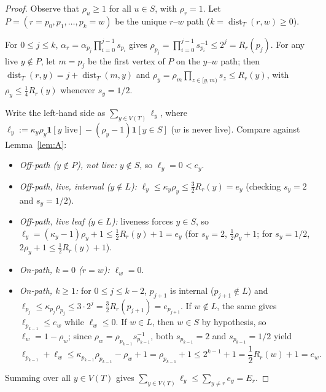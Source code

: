 \documentclass[11pt]{article}
\DeclareMathOperator{\dist}{dist}
\begin{document}
\begin{proof}
Observe that $\rho_u \ge 1$ for all $u \in S$, with $\rho_r = 1$. Let $P = (r = p_0, p_1, \dots, p_k = w)$ be the unique $r$--$w$ path ($k = \dist_T(r,w) \ge 0$).

For $0 \le j \le k$, $\alpha_r = \alpha_{p_j}\prod_{i=0}^{j-1} s_{p_i}$ gives $\rho_{p_j} = \prod_{i=0}^{j-1} s_{p_i}^{-1} \le 2^j = R_r(p_j)$. For any live $y \notin P$, let $m = p_j$ be the first vertex of $P$ on the $y$--$w$ path; then $\dist_T(r,y) = j + \dist_T(m,y)$ and $\rho_y = \rho_m \prod_{z \in [y,m)} s_z \le R_r(y)$, with $\rho_y \le \frac{1}{4} R_r(y)$ whenever $s_y = 1/2$.

Write the left-hand side as $\sum_{y \in V(T)} \ell_y$, where $\ell_y := \kappa_y \rho_y \mathbf{1}[y \text{ live}] - (\rho_y - 1)\mathbf{1}[y \in S]$ ($w$ is never live). Compare against Lemma~\ref{lem:A}:
\begin{itemize}
  \item \emph{Off-path ($y \notin P$), not live:} $y \notin S$, so $\ell_y = 0 < e_y$.
  \item \emph{Off-path, live, internal ($y \notin L$):} $\ell_y \le \kappa_y \rho_y \le \frac{3}{2} R_r(y) = e_y$ (checking $s_y = 2$ and $s_y = 1/2$).
  \item \emph{Off-path, live leaf ($y \in L$):} liveness forces $y \in S$, so $\ell_y = (\kappa_y - 1)\rho_y + 1 \le \frac{1}{2} R_r(y) + 1 = e_y$ (for $s_y = 2$, $\frac{1}{2}\rho_y + 1$; for $s_y = 1/2$, $2\rho_y + 1 \le \frac{1}{2} R_r(y) + 1$).
  \item \emph{On-path, $k = 0$ ($r = w$):} $\ell_w = 0$.
  \item \emph{On-path, $k \ge 1$:} for $0 \le j \le k-2$, $p_{j+1}$ is internal ($p_{j+1} \notin L$) and $\ell_{p_j} \le \kappa_{p_j} \rho_{p_j} \le 3 \cdot 2^j = \frac{3}{2} R_r(p_{j+1}) = e_{p_{j+1}}$. If $w \notin L$, the same gives $\ell_{p_{k-1}} \le e_w$ while $\ell_w \le 0$. If $w \in L$, then $w \in S$ by hypothesis, so $\ell_w = 1 - \rho_w$; since $\rho_w = \rho_{p_{k-1}} s_{p_{k-1}}^{-1}$, both $s_{p_{k-1}} = 2$ and $s_{p_{k-1}} = 1/2$ yield
  \[
  \ell_{p_{k-1}} + \ell_w \le \kappa_{p_{k-1}} \rho_{p_{k-1}} - \rho_w + 1 = \rho_{p_{k-1}} + 1 \le 2^{k-1} + 1 = \frac{1}{2} R_r(w) + 1 = e_w.
  \]
\end{itemize}
Summing over all $y \in V(T)$ gives $\sum_{y \in V(T)} \ell_y \le \sum_{y \neq r} e_y = E_r$.
\end{proof}
\end{document}
